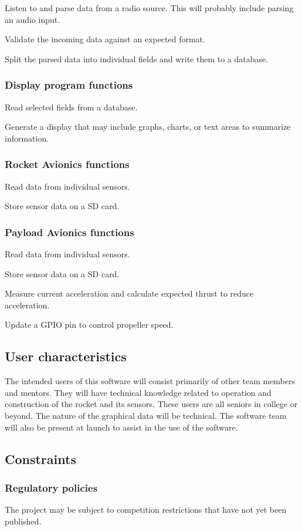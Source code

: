 \documentclass[onecolumn, draftclsnofoot, 10pt, compsoc]{IEEEtran}
\begin{document}
Listen to and parse data from a radio source.  This will probably include parsing an audio input.

Validate the incoming data against an expected format.

Split the parsed data into individual fields and write them to a database.

\subsubsection{Display program functions}
Read selected fields from a database.

Generate a display that may include graphs, charts, or text areas to summarize information.

\subsubsection{Rocket Avionics functions}
Read data from individual sensors.

Store sensor data on a SD card.

\subsubsection{Payload Avionics functions}
Read data from individual sensors.

Store sensor data on a SD card.

Measure current acceleration and calculate expected thrust to reduce acceleration.

Update a GPIO pin to control propeller speed.

\subsection{User characteristics}
The intended users of this software will consist primarily of other team members and mentors. They will have technical knowledge related to operation and construction of the rocket and its sensors. These users are all seniors in college or beyond. The nature of the graphical data will be technical. The software team will also be present at launch to assist in the use of the software.

\subsection{Constraints}
\subsubsection{Regulatory policies}
The project may be subject to competition restrictions that have not yet been published.
\end{document}
